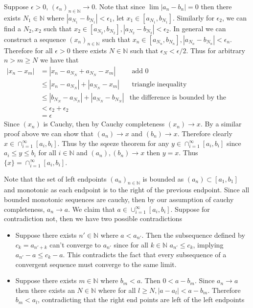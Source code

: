 \documentclass[12pt, letterpaper]{article}
\newcommand{\N}{\mathbb{N}}
\begin{document}
\begin{enumerate}
	Suppose $\epsilon >0$, $(\epsilon_n)_{n \in \N} \to 0$. Note that since $\lim |a_n-b_n| = 0$ then there exists
	$N_1 \in \N$ where $|a_{N_1} - b_{N_1}| < \epsilon_1$, let $x_1 \in [a_{N_1},b_{N_1}].$  Similarly for $\epsilon_2$, we can find a $N_2, x_2$ such that
	$x_2 \in [a_{N_2},b_{N_2}], |a_{N_2}-b_{N_2}| < \epsilon_2$.  In general we can
	construct a sequence $(x_n)_{n\in \N}$ such that $x_n \in [a_{N_n},b_{N_n}], |a_{N_n}-b_{N_n}| < \epsilon_n$.  Therefore for all $\epsilon > 0$ there exists $N\in\N$
	such that $\epsilon_N < \epsilon/2$.  Thus for arbitrary $n > m  \geq N$ we have that
	\begin{align*}
	|x_n - x_m| &= |x_n - a_{N_N} + a_{N_N} - x_m| & \text{ add 0}\\
	&\leq |x_n - a_{N_N}| + |a_{N_N} - x_m| & \text{ triangle inequality}\\
	&\leq |b_{N_N} - a_{N_N}| + |a_{N_N} - b_{N_N}| & \text{the difference is bounded by the endpoints}\\
	&< \epsilon_2 + \epsilon_2\\
	&= \epsilon
	\end{align*}
	Since $(x_n)$ is Cauchy, then by Cauchy completeness $(x_n) \to x$.  By a similar proof above we can show that $(a_n) \to x$ and $(b_n) \to x$. Therefore clearly 
	$x \in \cap_{i=1}^\infty [a_i,b_i].$  Thus by the sqeeze theorem for any 
	$y \in \cap_{i=1}^\infty [a_i,b_i]$ since $a_i \leq y \leq b_i$ for all $i \in \N$ and $(a_n),(b_n) \to x$ then $y = x$.  Thus $\{x\} = \cap_{i=1}^\infty [a_i,b_i]$.  
	
	\iffalse
	Note that the set of left endpoints $(a_n)_{n \in \N} $ is bounded as $(a_n) \subset [a_1,b_1]$ and monotonic as each endpoint is to the right of the previous endpoint.  Since all bounded monotonic sequences are cauchy, then by our assumption of cauchy completeness, 
	$a_n \to a$.  We claim that $a \in \cup_{i=1}^\infty [a_i,b_i]$. 
	Suppose for contradiction not, then we have two possible contradictions
	\begin{itemize}
		\item Suppose there exists $n' \in \N$ where $a < a_{n'}$.  Then
		the subsequence defined by $c_k = a_{n'+k}$ can't converge to
		$a_{n'}$ since for all $k \in \N$ $a_{n'} \leq c_k$, implying 
		$a_{n'} - a \leq c_k - a$.  This contradicts the fact that 
		every subsequence of a convergent sequence must converge to the same limit.
		\item Suppose there exists $m \in \N$ where $b_{m} < a$.  Then 
		$0<a-b_m$. 
		Since $a_n \to a$ then there exists an $N \in \N$ where for all 
		$l \geq N, |a-a_l| < a-b_m$.  Therefore $b_m < a_l$, contradicting that the right end points are left of the left endpoints
 	\end{itemize}	 
	

\end{enumerate}
\end{document}
